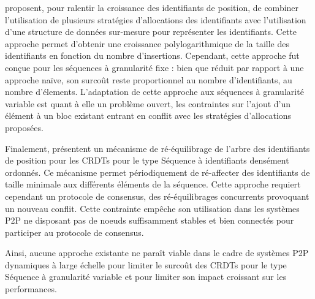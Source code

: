 \cite{lseq2013,lseq2017} proposent, pour ralentir la croissance des identifiants de position, de combiner l'utilisation de plusieurs stratégies d'allocations des identifiants avec l'utilisation d'une structure de données sur-mesure pour représenter les identifiants.
Cette approche permet d'obtenir une croissance polylogarithmique de la taille des identifiants en fonction du nombre d'insertions.
Cependant, cette approche fut conçue pour les séquences à granularité fixe : bien que réduit par rapport à une approche naïve, son surcoût reste proportionnel au nombre d'identifiants, \ie au nombre d'élements.
L'adaptation de cette approche aux séquences à granularité variable est quant à elle un problème ouvert, les contraintes sur l'ajout d'un élément à un bloc existant entrant en conflit avec les stratégies d'allocations proposées.

Finalement, \cite{letia:hal-01248270,zawirski:hal-01248197} présentent un mécanisme de ré-équilibrage de l'arbre des identifiants de position pour les \acp{CRDT} pour le type Séquence à identifiants densément ordonnés.
Ce mécanisme permet périodiquement de ré-affecter des identifiants de taille minimale aux différents éléments de la séquence.
Cette approche requiert cependant un protocole de consensus, des ré-équilibrages concurrents provoquant un nouveau conflit.
Cette contrainte empêche son utilisation dans les systèmes \ac{P2P} ne disposant pas de noeuds suffisamment stables et bien connectés pour participer au protocole de consensus.

Ainsi, aucune approche existante ne paraît viable dans le cadre de systèmes \ac{P2P} dynamiques à large échelle pour limiter le surcoût des \acp{CRDT} pour le type Séquence à granularité variable et pour limiter son impact croissant sur les performances.
